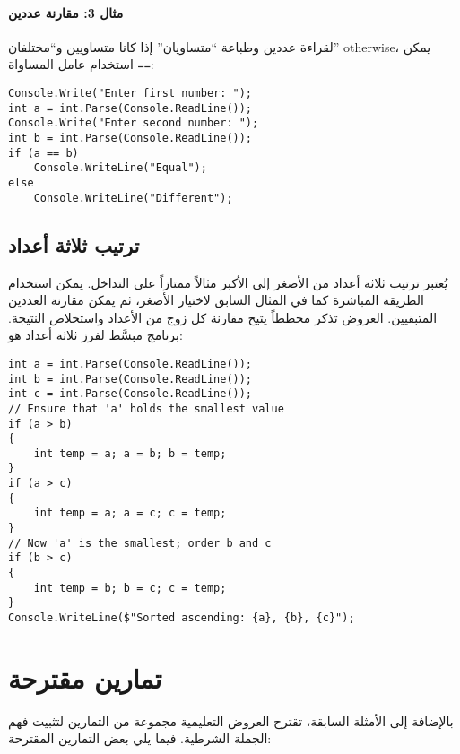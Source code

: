 \documentclass[12pt]{article}
\begin{document}
\paragraph{مثال 3: مقارنة عددين} لقراءة عددين وطباعة ``متساويان'' إذا كانا متساويين و``مختلفان'' otherwise، يمكن استخدام عامل المساواة \verb|==|:


\begin{english}
\begin{verbatim}
Console.Write("Enter first number: ");
int a = int.Parse(Console.ReadLine());
Console.Write("Enter second number: ");
int b = int.Parse(Console.ReadLine());
if (a == b)
    Console.WriteLine("Equal");
else
    Console.WriteLine("Different");
\end{verbatim}
\end{english}

\subsection{ترتيب ثلاثة أعداد}

يُعتبر ترتيب ثلاثة أعداد من الأصغر إلى الأكبر مثالاً ممتازاً على التداخل. يمكن استخدام الطريقة المباشرة كما في المثال السابق لاختيار الأصغر، ثم يمكن مقارنة العددين المتبقيين. العروض تذكر مخططاً يتيح مقارنة كل زوج من الأعداد واستخلاص النتيجة. برنامج مبسَّط لفرز ثلاثة أعداد هو:


\begin{english}
\begin{verbatim}
int a = int.Parse(Console.ReadLine());
int b = int.Parse(Console.ReadLine());
int c = int.Parse(Console.ReadLine());
// Ensure that 'a' holds the smallest value
if (a > b)
{
    int temp = a; a = b; b = temp;
}
if (a > c)
{
    int temp = a; a = c; c = temp;
}
// Now 'a' is the smallest; order b and c
if (b > c)
{
    int temp = b; b = c; c = temp;
}
Console.WriteLine($"Sorted ascending: {a}, {b}, {c}");
\end{verbatim}
\end{english}

\section{تمارين مقترحة}

بالإضافة إلى الأمثلة السابقة، تقترح العروض التعليمية مجموعة من التمارين لتثبيت فهم الجملة الشرطية. فيما يلي بعض التمارين المقترحة:
\end{document}
